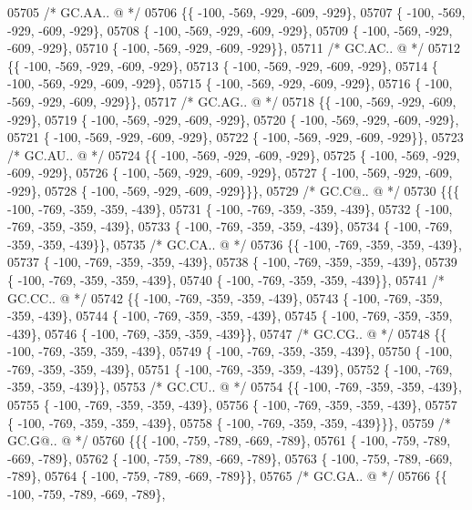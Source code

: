 \begin{DoxyCode}
05705 \textcolor{comment}{/* GC.AA.. @ */}
05706 \{\{ -100, -569, -929, -609, -929\},
05707 \{ -100, -569, -929, -609, -929\},
05708 \{ -100, -569, -929, -609, -929\},
05709 \{ -100, -569, -929, -609, -929\},
05710 \{ -100, -569, -929, -609, -929\}\},
05711 \textcolor{comment}{/* GC.AC.. @ */}
05712 \{\{ -100, -569, -929, -609, -929\},
05713 \{ -100, -569, -929, -609, -929\},
05714 \{ -100, -569, -929, -609, -929\},
05715 \{ -100, -569, -929, -609, -929\},
05716 \{ -100, -569, -929, -609, -929\}\},
05717 \textcolor{comment}{/* GC.AG.. @ */}
05718 \{\{ -100, -569, -929, -609, -929\},
05719 \{ -100, -569, -929, -609, -929\},
05720 \{ -100, -569, -929, -609, -929\},
05721 \{ -100, -569, -929, -609, -929\},
05722 \{ -100, -569, -929, -609, -929\}\},
05723 \textcolor{comment}{/* GC.AU.. @ */}
05724 \{\{ -100, -569, -929, -609, -929\},
05725 \{ -100, -569, -929, -609, -929\},
05726 \{ -100, -569, -929, -609, -929\},
05727 \{ -100, -569, -929, -609, -929\},
05728 \{ -100, -569, -929, -609, -929\}\}\},
05729 \textcolor{comment}{/* GC.C@.. @ */}
05730 \{\{\{ -100, -769, -359, -359, -439\},
05731 \{ -100, -769, -359, -359, -439\},
05732 \{ -100, -769, -359, -359, -439\},
05733 \{ -100, -769, -359, -359, -439\},
05734 \{ -100, -769, -359, -359, -439\}\},
05735 \textcolor{comment}{/* GC.CA.. @ */}
05736 \{\{ -100, -769, -359, -359, -439\},
05737 \{ -100, -769, -359, -359, -439\},
05738 \{ -100, -769, -359, -359, -439\},
05739 \{ -100, -769, -359, -359, -439\},
05740 \{ -100, -769, -359, -359, -439\}\},
05741 \textcolor{comment}{/* GC.CC.. @ */}
05742 \{\{ -100, -769, -359, -359, -439\},
05743 \{ -100, -769, -359, -359, -439\},
05744 \{ -100, -769, -359, -359, -439\},
05745 \{ -100, -769, -359, -359, -439\},
05746 \{ -100, -769, -359, -359, -439\}\},
05747 \textcolor{comment}{/* GC.CG.. @ */}
05748 \{\{ -100, -769, -359, -359, -439\},
05749 \{ -100, -769, -359, -359, -439\},
05750 \{ -100, -769, -359, -359, -439\},
05751 \{ -100, -769, -359, -359, -439\},
05752 \{ -100, -769, -359, -359, -439\}\},
05753 \textcolor{comment}{/* GC.CU.. @ */}
05754 \{\{ -100, -769, -359, -359, -439\},
05755 \{ -100, -769, -359, -359, -439\},
05756 \{ -100, -769, -359, -359, -439\},
05757 \{ -100, -769, -359, -359, -439\},
05758 \{ -100, -769, -359, -359, -439\}\}\},
05759 \textcolor{comment}{/* GC.G@.. @ */}
05760 \{\{\{ -100, -759, -789, -669, -789\},
05761 \{ -100, -759, -789, -669, -789\},
05762 \{ -100, -759, -789, -669, -789\},
05763 \{ -100, -759, -789, -669, -789\},
05764 \{ -100, -759, -789, -669, -789\}\},
05765 \textcolor{comment}{/* GC.GA.. @ */}
05766 \{\{ -100, -759, -789, -669, -789\},

\end{DoxyCode}
